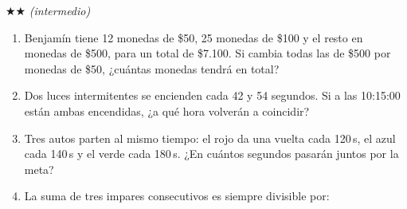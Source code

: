 \documentclass[11pt, letterpaper]{article}
\begin{document}
$\bigstar\bigstar$ \textit{(intermedio)}

\begin{enumerate}[label=\textbf{\arabic*.}, leftmargin=*, resume]
  \item Benjam\'in tiene 12 monedas de \$50, 25 monedas de \$100 y el resto en monedas de \$500, para un total de \$7.100. Si cambia todas las de \$500 por monedas de \$50, ¿cu\'antas monedas tendr\'a en total?
  \vspace{3cm}

  \item Dos luces intermitentes se encienden cada 42 y 54 segundos. Si a las 10:15:00 est\'an ambas encendidas, ¿a qu\'e hora volver\'an a coincidir?
  \vspace{3cm}

  \item Tres autos parten al mismo tiempo: el rojo da una vuelta cada 120\,s, el azul cada 140\,s y el verde cada 180\,s. ¿En cu\'antos segundos pasar\'an juntos por la meta?
  \vspace{3cm}

  \item
  \begin{minipage}[t]{\linewidth}
  La suma de tres impares consecutivos es siempre divisible por:
  \\%
  \begin{minipage}{\linewidth}
  \vspace{7mm}
  \end{minipage}
  \vspace{7mm}
  \end{minipage}


\end{enumerate}
\end{document}
